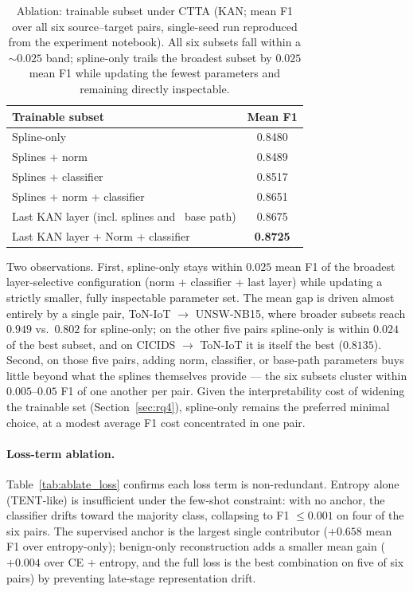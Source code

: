 \documentclass[10pt, conference, letterpaper]{IEEEtran}
\begin{document}
\begin{table}[h]
\centering
\caption{Ablation: trainable subset under CTTA (KAN; mean F1 over all six source--target pairs, single-seed run reproduced from the experiment notebook). All six subsets fall within a ${\sim}0.025$ band; spline-only trails the broadest subset by $0.025$ mean F1 while updating the fewest parameters and remaining directly inspectable.}
\label{tab:ablate_layers}
\begin{tabular}{lc}
\toprule
\textbf{Trainable subset} & \textbf{Mean F1} \\
\midrule
Spline-only                          & 0.8480 \\
Splines + norm                       & 0.8489 \\
Splines + classifier                 & 0.8517 \\
Splines + norm + classifier          & 0.8651 \\
Last KAN layer (incl. splines and \ base path)    & 0.8675 \\
Last KAN layer + Norm + classifier      & \textbf{0.8725} \\
\bottomrule
\end{tabular}
\end{table}



Two observations. First, spline-only stays within $0.025$ mean F1 of the broadest layer-selective configuration (norm + classifier + last layer) while updating a strictly smaller, fully inspectable parameter set. The mean gap is driven almost entirely by a single pair, ToN-IoT $\to$ UNSW-NB15, where broader subsets reach $0.949$ vs.\ $0.802$ for spline-only; on the other five pairs spline-only is within $0.024$ of the best subset, and on CICIDS $\to$ ToN-IoT it is itself the best ($0.8135$). Second, on those five pairs, adding norm, classifier, or base-path parameters buys little beyond what the splines themselves provide --- the six subsets cluster within $0.005$--$0.05$ F1 of one another per pair. Given the interpretability cost of widening the trainable set (Section~\ref{sec:rq4}), spline-only remains the preferred minimal choice, at a modest average F1 cost concentrated in one pair.

\paragraph{Loss-term ablation.} Table~\ref{tab:ablate_loss} confirms each loss term is non-redundant. Entropy alone (TENT-like) is insufficient under the few-shot constraint: with no anchor, the classifier drifts toward the majority class, collapsing to F1 $\leq 0.001$ on four of the six pairs. The supervised anchor is the largest single contributor ($+0.658$ mean F1 over entropy-only); benign-only reconstruction adds a smaller mean gain ($+0.004$ over CE + entropy, and the full loss is the best combination on five of six pairs) by preventing late-stage representation drift.
\end{document}
